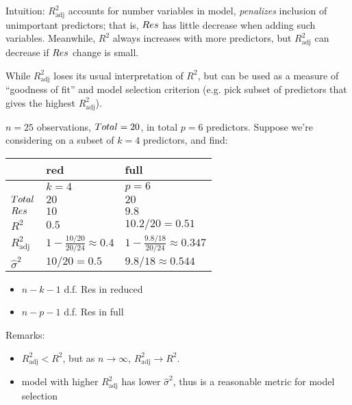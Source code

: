 Intuition: $ R^2_{\text{adj}} $
accounts for number variables in model,
\emph{penalizes} inclusion of unimportant
predictors; that is, $ \relax{Res} $
has little decrease when adding
such variables. Meanwhile, $ R^2 $
always increases with more predictors,
but $ R^2_{\text{adj}} $ can decrease
if $ \relax{Res} $ change is small.

While $ R^2_{\text{adj}} $ loses its usual
interpretation of $ R^2 $, but can be used
as a measure of ``goodness of fit''
and model selection criterion (e.g.
pick subset of predictors that gives the highest
$ R^2_{\text{adj}} $).


\begin{Example}{}{}
      $ n=25 $ observations, $ \relax{Total}=20 $,
      in total $ p=6 $ predictors. Suppose
      we're considering on a subset of $ k=4 $
      predictors, and find:

      \begin{center}
            \begin{tabularx}{0.7\linewidth}{@{}YYY@{}}
                                       & red                                  & full                                    \\
                  \midrule
                                       & $ k=4 $                              & $ p=6 $                                 \\
                  $ \relax{Total} $       & $ 20 $                               & $ 20 $                                  \\
                  $ \relax{Res} $         & $ 10 $                               & $ 9.8 $                                 \\
                  $ R^2 $              & $ 0.5 $                              & $ 10.2/20=0.51 $                        \\
                  $ R^2_{\text{adj}} $ & $ 1-\frac{10/20}{20/24}\approx 0.4 $ & $ 1-\frac{9.8/18}{20/24}\approx 0.347 $ \\
                  $ \hat{\sigma}^2 $   & $ 10/20=0.5 $                        & $ 9.8/18\approx 0.544 $
            \end{tabularx}
      \end{center}
      \begin{itemize}
            \item $ n-k-1 $ d.f. Res in reduced
            \item $ n-p-1 $ d.f. Res in full
      \end{itemize}
      Remarks:
      \begin{itemize}
            \item $ R^2_{\text{adj}}<R^2 $, but as $ n\to\infty $,
                  $ R^2_{\text{adj}}\to R^2 $.
            \item model with higher $ R^2_{\text{adj}} $
                  has lower $ \hat{\sigma}^2 $,
                  thus is a reasonable metric for model selection
      \end{itemize}
\end{Example}

